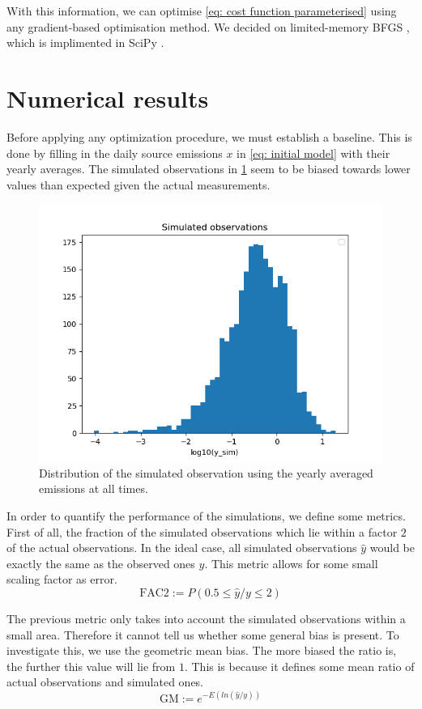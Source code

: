 \documentclass{article}
\begin{document}
With this information, we can optimise \cref{eq: cost function parameterised} using any gradient-based optimisation method. We decided on limited-memory BFGS \cite{Nocedal2006}, which is implimented in SciPy \cite{virtanen2020scipy}.

\section{Numerical results}
\label{sec: numerical results}

Before applying any optimization procedure, we must establish a baseline. This is done by filling in the daily source emissions $x$ in \cref{eq: initial model} with their yearly averages. The simulated observations in \cref{fig: y-histogram baseline} seem to be biased towards lower values than expected given the actual measurements.\\


\begin{figure}
	\centering
	\includegraphics[width=0.5\linewidth]{../plots/original_simulated_observation.png}
	\caption{Distribution of the simulated observation using the yearly averaged emissions at all times.}
	\label{fig: y-histogram baseline}
\end{figure}


In order to quantify the performance of the simulations, we define some metrics. First of all, the fraction of the simulated observations which lie within a factor $2$ of the actual observations. In the ideal case, all simulated observations $\hat{y}$ would be exactly the same as the observed ones $y$. This metric allows for some small scaling factor as error.
\begin{equation}
	\text{FAC2}:=P(0.5\leq\hat{y}/y\leq 2)
\end{equation}

The previous metric only takes into account the simulated observations within a small area. Therefore it cannot tell us whether some general bias is present. To investigate this, we use the geometric mean bias. The more biased the ratio is, the further this value will lie from $1$. This is because it defines some mean ratio of actual observations and simulated ones.
\begin{equation}
	\text{GM}:=e^{-E(ln(\hat{y}/y))}
\end{equation}
\end{document}
